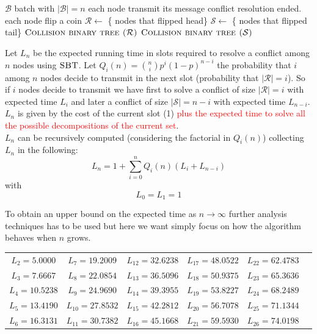 \documentclass[12pt,a4paper]{report}
\newcommand{\algname}[1]{\ensuremath{\mbox{\sc #1}}}
\begin{document}
\begin{algorithm}[h!]
\caption{\algname{Collision binary tree ($\mathcal{B}$)}}
\label{alg:binarytree}
\begin{algorithmic}
\STATE {}
\REQUIRE $\mathcal{B}$ batch with $|\mathcal{B}|=n$
\STATE each node transmit its message
	\STATE conflict resolution ended.
\ELSE
	\STATE each node flip a coin
	\STATE $\mathcal{R} \gets$ \{ nodes that flipped head\}
	\STATE $\mathcal{S} \gets$ \{ nodes that flipped tail\}
	\STATE \algname{Collision binary tree ($\mathcal{R}$)}
	\STATE \algname{Collision binary tree ($\mathcal{S}$)}
\ENDIF
\end{algorithmic}
\end{algorithm}

Let $L_{n}$ be the expected running time in slots required to resolve a conflict among $n$ nodes using \algname{SBT}.
Let $Q_{i}(n)={n\choose i} p^{i} (1-p)^{n-i}$ the probability that $i$ among $n$ nodes decide to transmit in the next slot (probability that $|\mathcal{R}|=i$). So if $i$ nodes decide to transmit we have first to solve a conflict of size $|\mathcal{R}|=i$ with expected time $L_{i}$ and later a conflict of size $|\mathcal{S}|=n-i$ with expected time $L_{n-i}$. $L_{n}$ is given by the cost of the current slot (1) \textcolor{red}{plus the expected time to solve all the possible decompositions of the current set}.\\
$L_{n}$ can be recursively computed (considering the factorial in $Q_{i}(n)$) collecting  $L_{n}$ in the following:
\begin{equation}
L_{n} = 1 + \sum_{i=0}^{n} Q_{i}(n) (L_{i}+L_{n-i})
\end{equation}
with
\begin{equation*}
L_{0} = L_{1}  = 1
\end{equation*}

To obtain an upper bound on the expected time as $ n \rightarrow \infty$ further analysis techniques has to be used but here we want simply focus on how the algorithm behaves when $n$ grows.\\

\begin{center}
\begin{tabular}{cccccc}
$L_{2} = 5.0000 $&$L_{7} = 19.2009 $  &$L_{12} = 32.6238 $  &$L_{17} = 48.0522 $  &$L_{22} = 62.4783 $ \\ 
$L_{3} = 7.6667 $&$L_{8} = 22.0854 $  &$L_{13} = 36.5096 $  &$L_{18} = 50.9375 $  &$L_{23} = 65.3636 $ \\ 
$L_{4} = 10.5238 $&$L_{9} = 24.9690 $  &$L_{14} = 39.3955 $  &$L_{19} = 53.8227 $  &$L_{24} = 68.2489 $ \\ 
$L_{5} = 13.4190 $&$L_{10} = 27.8532 $  &$L_{15} = 42.2812 $  &$L_{20} = 56.7078 $  &$L_{25} = 71.1344 $ \\  
$L_{6} = 16.3131 $&$L_{11} = 30.7382 $  &$L_{16} = 45.1668 $  &$L_{21} = 59.5930 $  &$L_{26} = 74.0198 $ \\  
\end{tabular} 
\end{center}
\end{document}
